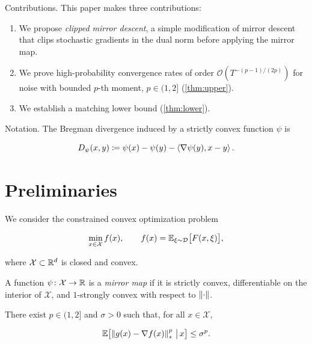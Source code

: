 Contributions. This paper makes three contributions:

\begin{enumerate}
  \item We propose \emph{clipped mirror descent}, a simple modification of mirror descent that clips stochastic gradients in the dual norm before applying the mirror map.
  \item We prove high-probability convergence rates of order $\mathcal{O}(T^{-(p-1)/(2p)})$ for noise with bounded $p$-th moment, $p \in (1, 2]$ (\cref{thm:upper}).
  \item We establish a matching lower bound (\cref{thm:lower}).
\end{enumerate}

Notation. The Bregman divergence induced by a strictly convex function $\psi$ is

\begin{equation*}D_{\psi}(x, y) \coloneqq \psi(x) - \psi(y) - \left\langle\nabla \psi(y),x - y\right\rangle.\end{equation*}

\section{Preliminaries}\label{sec:prelim}

We consider the constrained convex optimization problem

\begin{equation}\label{eq:problem}\min_{x \in \mathcal{X}}f(x), \qquad f(x) = \mathbb{E}_{\xi \sim \mathcal{D}}\bigl[ F(x, \xi) \bigr],\end{equation}

where $\mathcal{X}\subset \mathbb{R}^{d}$ is closed and convex.

\begin{definition}\label{def:mirror}
A function $\psi \colon \mathcal{X}\to \mathbb{R}$ is a \emph{mirror map} if it is strictly convex, differentiable on the interior of $\mathcal{X}$, and $1$-strongly convex with respect to $\left\lVert\cdot\right\rVert$.
\end{definition}

\begin{assumption}\label{ass:moment}
There exist $p \in (1, 2]$ and $\sigma > 0$ such that, for all $x \in \mathcal{X}$,

\begin{equation*}\mathbb{E}\bigl[ \left\lVert g(x) - \nabla f(x)\right\rVert_{*}^{p} \,\big|\, x \bigr] \leq \sigma^{p}.\end{equation*}
\end{assumption}

